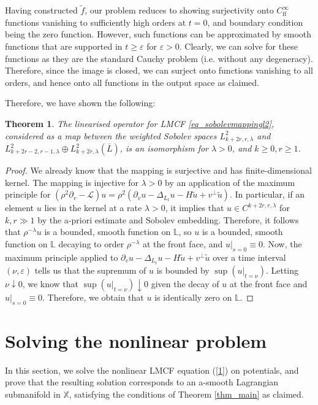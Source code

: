 \documentclass[10pt, a4paper]{article}
\theoremstyle{plain}%
\newtheorem{theorem}{Theorem}[section]
\theoremstyle{definition}
\numberwithin{figure}{section}
\numberwithin{equation}{section}
\newcommand{\bL}{\mathbb{L}}
\newcommand{\bX}{\mathbb{X}}
\newcommand{\pa}{\partial}
\newcommand{\tu}{\tilde{u}}
\newcommand{\ep}{\varepsilon}
\newcommand{\cL}{\mathcal{L}}
\newcommand{\ff}{\mathrm{ff}}
\begin{document}
Having constructed $\tilde{f}$, our problem reduces to showing surjectivity onto $C^\infty_\ff$ functions vanishing to sufficiently high orders at $t=0$, and boundary condition being the zero function. However, such functions can be approximated by smooth functions that are supported in $t\geq \varepsilon$ for $\varepsilon >0$. Clearly, we can solve for these functions as they are the standard Cauchy problem (i.e. without any degeneracy). Therefore, since the image is closed, we can surject onto functions vanishing to all orders, and hence onto all functions in the output space as claimed. 


Therefore, we have shown the following:
\begin{theorem}\label{thm_isomorphismL}
	The linearised operator for LMCF \eqref{eq_sobolevmappingl2}, considered as a map between the weighted Sobolev spaces $L^2_{k+2r,r,\lambda}$ and $L^2_{k+2r-2,r-1,\lambda}\oplus L^2_{k+2r,\lambda}(\overline{L})$, is an isomorphism for $\lambda > 0$, and $k\geq 0, r\geq 1$.
\end{theorem}
\begin{proof}
	We already know that the mapping is surjective and has finite-dimensional kernel. The mapping is injective for $\lambda>0$ by an application of the maximum principle for $(\rho^2\pa_v-\cL)u = \rho^2(\pa_vu-\Delta_{L_t}u-H\tu + v^\perp \tu)$. In particular, if an element $u$ lies in the kernel at a rate $\lambda>0$, it implies that $u\in C^{k+2r,r,\lambda}$ for $k,r\gg1$ by the a-priori estimate and Sobolev embedding. Therefore, it follows that $\rho^{-\lambda} u$ is a bounded, smooth function on $\bL$, so $u$ is a bounded, smooth function on $\bL$ decaying to order $\rho^{-\lambda}$ at the front face, and $u|_{s=0}\equiv0$. Now, the maximum principle applied to $\pa_vu-\Delta_{L_t}u-H\tu+v^\perp \tu$ over a time interval $(\nu,\ep)$ tells us that the supremum of $u$ is bounded by $\sup(u|_{t=\nu})$. Letting $\nu \downarrow 0$, we know that $\sup(u|_{t=\nu}) \downarrow 0$ given the decay of $u$ at the front face and $u|_{s=0}\equiv 0$. Therefore, we obtain that $u$ is identically zero on $\bL$.    
\end{proof}




\section{Solving the nonlinear problem}\label{sec_nonlinearproblem}
In this section, we solve the nonlinear LMCF equation (\ref{1}) on potentials, and prove that the resulting solution corresponds to an a-smooth Lagrangian submanifold in $\bX$, satisfying the conditions of Theorem \ref{thm_main} as claimed. 
\end{document}
